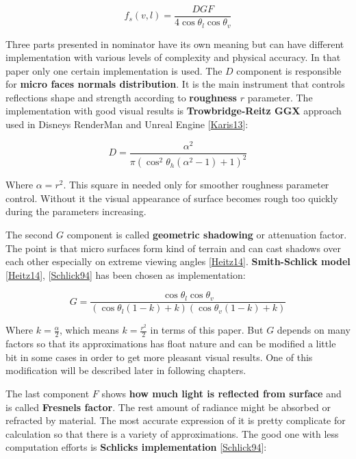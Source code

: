 \[f_s(v,l)=\frac{DGF}{4\cos\theta_l\cos\theta_v}\]

Three parts presented in nominator have its own meaning but can have different implementation with various levels of complexity and physical accuracy. In that paper only one certain implementation is used. The $D$ component is responsible for {\bfseries micro faces normals distribution}. It is the main instrument that controls reflection\textquotesingle{}s shape and strength according to {\bfseries roughness} $r$ parameter. The implementation with good visual results is {\bfseries Trowbridge-\/\+Reitz G\+GX} approach used in Disney\textquotesingle{}s Render\+Man and Unreal Engine \mbox{[}\hyperlink{specification__pbr_math_Karis13}{Karis13}\mbox{]}\+:

\[D=\frac{\alpha^2}{\pi(\cos^2\theta_h(\alpha^2-1) + 1)^2}\]

Where $\alpha = r^2$. This square in needed only for smoother roughness parameter control. Without it the visual appearance of surface becomes rough too quickly during the parameter\textquotesingle{}s increasing.

The second $G$ component is called {\bfseries geometric shadowing} or attenuation factor. The point is that micro surfaces form kind of terrain and can cast shadows over each other especially on extreme viewing angles \mbox{[}\hyperlink{specification__pbr_math_Heitz14}{Heitz14}\mbox{]}. {\bfseries Smith-\/\+Schlick model} \mbox{[}\hyperlink{specification__pbr_math_Heitz14}{Heitz14}\mbox{]}, \mbox{[}\hyperlink{specification__pbr_math_Schlick94}{Schlick94}\mbox{]} has been chosen as implementation\+:

\[\displaystyle G=\frac{\cos\theta_l \cos\theta_v}{(\cos\theta_l(1-k)+k)(\cos\theta_v(1-k)+k)}\]

Where $k=\frac{\alpha}{2}$, which means $k=\frac{r^2}{2}$ in terms of this paper. But $G$ depends on many factors so that it\textquotesingle{}s approximations has float nature and can be modified a little bit in some cases in order to get more pleasant visual results. One of this modification will be described later in following chapters.

The last component $F$ shows {\bfseries how much light is reflected from surface} and is called {\bfseries Fresnel\textquotesingle{}s factor}. The rest amount of radiance might be absorbed or refracted by material. The most accurate expression of it is pretty complicate for calculation so that there is a variety of approximations. The good one with less computation efforts is {\bfseries Schlick\textquotesingle{}s implementation} \mbox{[}\hyperlink{specification__pbr_math_Schlick94}{Schlick94}\mbox{]}\+:

